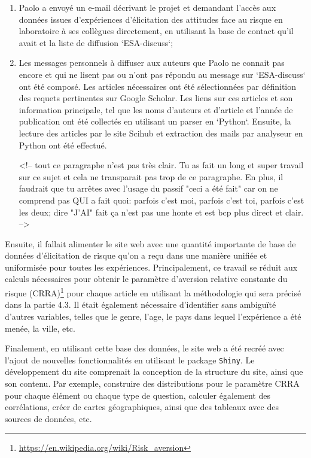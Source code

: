 \documentclass[12pt]{article}
\begin{document}
\begin{enumerate}
\item Paolo a envoyé un e-mail décrivant le projet et demandant l'accès aux données issues d'expériences d'élicitation des attitudes face au risque en laboratoire à ses collègues directement, en utilisant la base de contact qu'il avait et la liste de diffusion `ESA-discuss`;
\item Les messages personnels à diffuser aux auteurs que Paolo ne connait pas encore et qui ne lisent pas ou n'ont pas répondu au message sur `ESA-discuss` ont été composé. Les articles nécessaires ont été sélectionnées par définition des requets pertinentes sur Google Scholar. Les liens sur ces articles et son information principale, tel que les noms d'auteurs et d'article et l'année de publication ont été collectés en utilisant un parser en `Python`. Ensuite, la lecture des articles par le site Scihub et extraction des mails par analyseur en Python ont été effectué. 

<!-- tout ce paragraphe n'est pas très clair. Tu as fait un long et super travail sur ce sujet et cela ne transparait pas trop de ce paragraphe. En plus, il faudrait que tu arrêtes avec l'usage du passif "ceci a été fait" car on ne comprend pas QUI a fait quoi: parfois c'est moi, parfois c'est toi, parfois c'est les deux; dire "J'AI" fait ça n'est pas une honte et est bcp plus direct et clair. -->
\end{enumerate}

Ensuite, il fallait alimenter le site web avec une quantité importante
de base de données d'élicitation de risque qu'on a reçu dans une manière
unifiée et uniformisée pour toutes les expériences. Principalement, ce
travail se réduit aux calculs nécessaires pour obtenir le paramètre
d'aversion relative constante du risque (CRRA)\footnote{\url{https://en.wikipedia.org/wiki/Risk_aversion}}
pour chaque article en utilisant la méthodologie qui sera précisé dans
la partie 4.3. Il était également nécessaire d'identifier sans ambiguïté
d'autres variables, telles que le genre, l'age, le pays dans lequel
l'expérience a été menée, la ville, etc.

Finalement, en utilisant cette base des données, le site web a été
recréé avec l'ajout de nouvelles fonctionnalités en utilisant le package
\texttt{Shiny}. Le développement du site comprenait la conception de la
structure du site, ainsi que son contenu. Par exemple, construire des
distributions pour le paramètre CRRA pour chaque élément ou chaque type
de question, calculer également des corrélations, créer de cartes
géographiques, ainsi que des tableaux avec des sources de données, etc.
\end{document}
